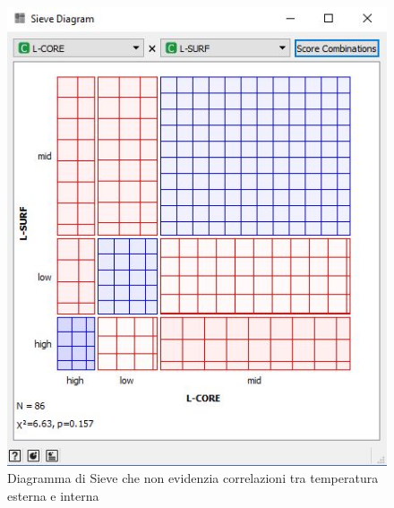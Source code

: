 \documentclass[a4paper, 12p]{report}
\begin{document}
\begin{figure}	
	\centering
	\includegraphics[scale = 0.4]{img/Sieve.JPG}
	\caption{Diagramma di Sieve che non evidenzia correlazioni tra temperatura esterna e interna }\label{fig:5}
\end{figure}
\end{document}
